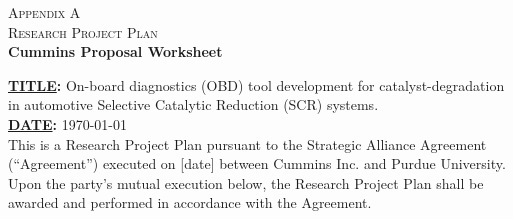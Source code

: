 \maketitle
\begin{center}
    \textsc{Appendix A}\\
    \bigskip
    \textsc{Research Project Plan}\\
    \textbf{Cummins Proposal Worksheet}
\end{center}

\textbf{\underline{TITLE}:} On-board diagnostics (OBD) tool development for
catalyst-degradation in automotive Selective Catalytic Reduction (SCR)
systems.\\

\textbf{\underline{DATE}:} \today\\

This is a Research Project Plan pursuant to the Strategic Alliance Agreement
(“Agreement”) executed on {\color{red}[date]} between Cummins Inc. and Purdue
University.  Upon the party's mutual execution below, the Research Project Plan
shall be awarded and performed in accordance with the Agreement.









\newpage


